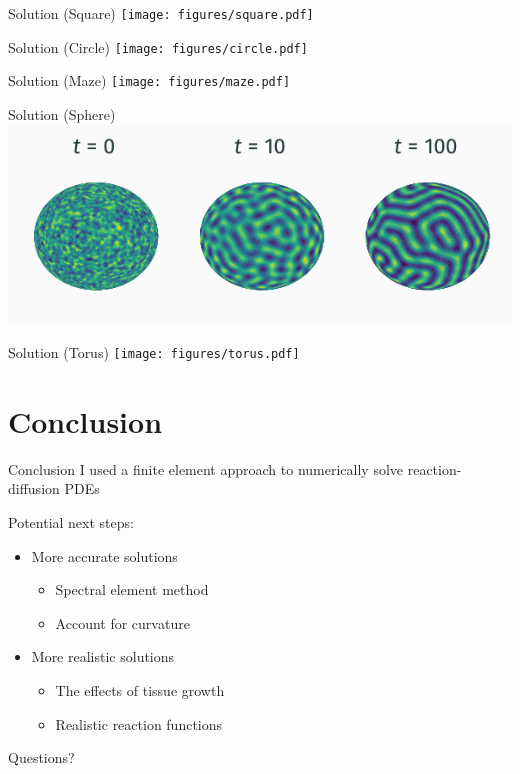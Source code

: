 \documentclass{beamer}
\begin{document}
\begin{frame}{Solution (Square)}
    \centering
    \texttt{[image: figures/square.pdf]}
\end{frame}

\begin{frame}{Solution (Circle)}
    \centering
    \texttt{[image: figures/circle.pdf]}
\end{frame}

\begin{frame}{Solution (Maze)}
    \centering
    \texttt{[image: figures/maze.pdf]}
\end{frame}

\begin{frame}{Solution (Sphere)}
    \centering
    \includegraphics{figures/sphere.pdf}
\end{frame}

\begin{frame}{Solution (Torus)}
    \centering
    \texttt{[image: figures/torus.pdf]}
\end{frame}


\section{Conclusion}

\begin{frame}{Conclusion}
    I used a finite element approach to numerically solve reaction-diffusion PDEs

    Potential next steps:
    \begin{itemize}
        \item More accurate solutions
        \begin{itemize}
            \item Spectral element method
            \item Account for curvature
        \end{itemize}
        \item More realistic solutions
        \begin{itemize}
            \item The effects of tissue growth 
            \item Realistic reaction functions
        \end{itemize}
    \end{itemize}
\end{frame}

\begin{frame}[standout]
    Questions?
\end{frame}
\end{document}
